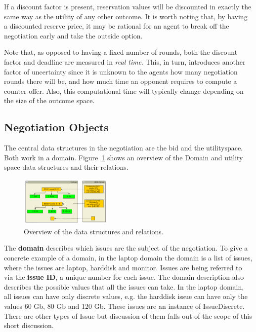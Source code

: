 \documentclass[]{article}
\begin{document}
If a discount factor is present, reservation values will be discounted in exactly the same way as the utility of any other outcome. It is worth noting that, by having a discounted reserve price, it may be rational for an agent to break off the negotiation early and take the outside option.

Note that, as opposed to having a fixed number of rounds, both the discount factor and deadline are measured in {\it real time}. This, in turn, introduces another factor of uncertainty since it is unknown to the agents how many negotiation rounds there will be, and how much time an opponent requires to compute a counter offer. Also, this computational time will typically change depending on the size of the outcome space. 

\subsection{Negotiation Objects}
The central data structures in the negotiation are the bid and the utilityspace. Both work in a domain. Figure~\ref{Fig:data structure and relation overview} shows an overview of the Domain and utility space data structures and their relations.

\begin{figure}[htb]
	\centering
	\includegraphics[width=0.4\textwidth]{media/datastructures.png}
	\caption{Overview of the data structures and relations.}\label{Fig:data structure and relation overview}
\end{figure}

The {\bf domain} describes which issues are the subject of the negotiation. To give a concrete example of a domain, in the laptop domain the domain is a list of issues, where the issues are laptop, harddisk and monitor. Issues are being referred to via the {\bf issue ID},  a unique number for each issue. The domain description also describes the possible values that all the issues can take. In the laptop domain, all issues can have only discrete values, e.g. the harddisk issue can have only the values 60 Gb, 80 Gb and 120 Gb. These issues are an instance of IssueDiscrete. There are other types of Issue but discussion of them falls out of the scope of this short discussion.
\end{document}
